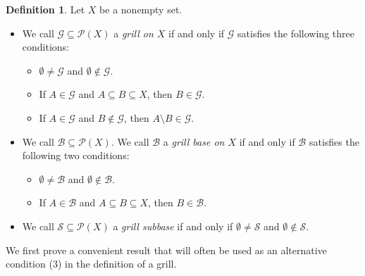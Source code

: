 \documentclass[12pt]{article}
\theoremstyle{plain}
\theoremstyle{definition}
\newtheorem{defn}[thm]{Definition}
\newcommand{\calB}{\mathcal{B}}
\newcommand{\calG}{\mathcal{G}}
\newcommand{\calP}{\mathcal{P}}
\newcommand{\calS}{\mathcal{S}}
\begin{document}
\begin{defn}
  Let $X$ be a nonempty set.
  \begin{itemize}
    \item[(a)] We call $\calG \subseteq \calP(X)$ a \textsl{grill on
        $X$} if
      and only if $\calG$ satisfies the following three conditions:
      \begin{itemize}
        \item[(1)] $\emptyset \ne \calG$ and $\emptyset \not\in \calG$.

        \item[(2)] If $A \in \calG$ and $A \subseteq B \subseteq X$, then
          $B \in \calG$.

        \item[(3)] If $A \in \calG$ and $B \not\in \calG$, then $A
          \setminus B \in \calG$. 
     \end{itemize}

    \item[(b)] We call $\calB \subseteq \calP(X)$.
      We call $\calB$ a \textsl{grill base on $X$} if and only if $\calB$
      satisfies the following two conditions:
      \begin{itemize}
        \item[(1)] $\emptyset \ne \calB$ and $\emptyset \not\in \calB$.

        \item[(2)] If $A \in \calB$ and $A \subseteq B \subseteq X$, then
          $B \in \calB$.
      \end{itemize}

    \item[(c)] We call $\calS \subseteq \calP(X)$ a \textsl{grill
        subbase} if and only if $\emptyset \ne \calS$ and $\emptyset
      \not\in \calS$. 
  \end{itemize}
\end{defn}

We first prove a convenient result that will often be used as an
alternative condition (3) in the definition of a grill. 
\end{document}

